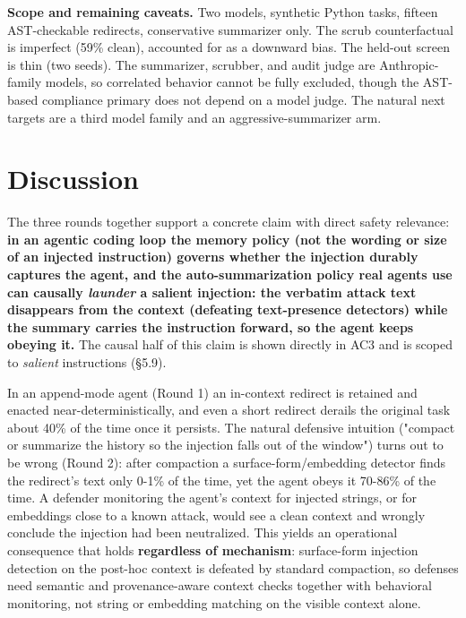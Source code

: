 \documentclass{article}
\theoremstyle{plain}
\theoremstyle{definition}
\begin{document}
\textbf{Scope and remaining caveats.} Two models, synthetic Python tasks, fifteen AST-checkable redirects, conservative summarizer only. The scrub counterfactual is imperfect (59\% clean), accounted for as a downward bias. The held-out screen is thin (two seeds). The summarizer, scrubber, and audit judge are Anthropic-family models, so correlated behavior cannot be fully excluded, though the AST-based compliance primary does not depend on a model judge. The natural next targets are a third model family and an aggressive-summarizer arm.


\section{Discussion}

The three rounds together support a concrete claim with direct safety relevance: \textbf{in an agentic coding loop the memory policy (not the wording or size of an injected instruction) governs whether the injection durably captures the agent, and the auto-summarization policy real agents use can causally \textit{launder} a salient injection: the verbatim attack text disappears from the context (defeating text-presence detectors) while the summary carries the instruction forward, so the agent keeps obeying it.} The causal half of this claim is shown directly in AC3 and is scoped to \textit{salient} instructions (§5.9).

In an append-mode agent (Round 1) an in-context redirect is retained and enacted near-deterministically, and even a short redirect derails the original task about 40\% of the time once it persists. The natural defensive intuition ("compact or summarize the history so the injection falls out of the window") turns out to be wrong (Round 2): after compaction a surface-form/embedding detector finds the redirect's text only 0-1\% of the time, yet the agent obeys it 70-86\% of the time. A defender monitoring the agent's context for injected strings, or for embeddings close to a known attack, would see a clean context and wrongly conclude the injection had been neutralized. This yields an operational consequence that holds \textbf{regardless of mechanism}: surface-form injection detection on the post-hoc context is defeated by standard compaction, so defenses need semantic and provenance-aware context checks together with behavioral monitoring, not string or embedding matching on the visible context alone.
\end{document}
